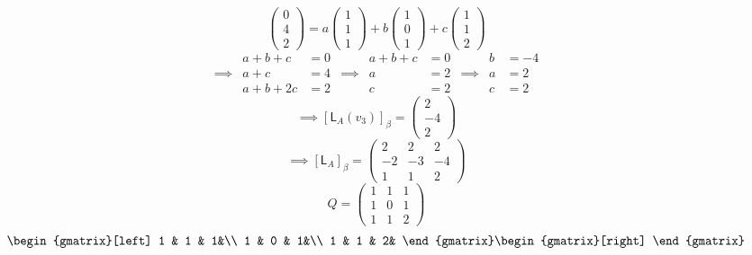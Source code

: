 \begin{enumerate}[(a)]
\begin{equation}
\begin{pmatrix}0\\4\\2\end{pmatrix}=
a\begin{pmatrix}1\\1\\1\end{pmatrix} +
b\begin{pmatrix}1\\0\\1\end{pmatrix} +
c\begin{pmatrix}1\\1\\2\end{pmatrix}
\end{equation}
\begin{align*}
& a+b+c &=0 & & a+b +c &=0 & & b &= -4\\
\implies& a +c &=4 &\implies& a &= 2 &\implies& a &=2\\
& a+b + 2c &= 2 & & c &=2 & &c &=2
\end{align*}
\begin{equation}
\implies \left[\mathsf{L}_A(v_3)\right]_\beta = \begin{pmatrix}2\\-4\\2\end{pmatrix}
\end{equation}
\begin{equation}
\implies [\mathsf{L}_A]_\beta = \begin{pmatrix}2&2&2\\-2&-3&-4\\1&1&2\end{pmatrix}
\end{equation}
\begin{equation}
Q = \begin{pmatrix}
1 & 1 & 1\\
1 & 0 & 1\\
1 & 1 & 2
\end{pmatrix}
\end{equation}
\begin{equation*}
\begin{gmatrix}[left]
1 & 1 & 1&\\
1 & 0 & 1&\\
1 & 1 & 2&
\end{gmatrix}
\begin{gmatrix}[right]

\end{gmatrix}
\end{equation*}
\end{enumerate}
